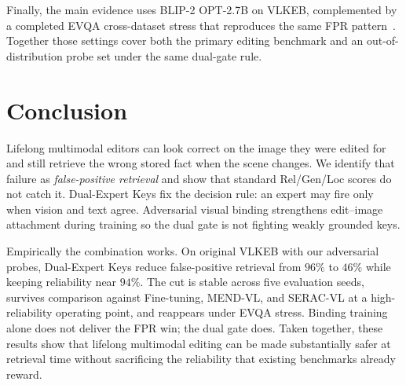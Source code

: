 \documentclass[letterpaper]{article} %
\begin{document}
Finally, the main evidence uses BLIP-2 OPT-2.7B on VLKEB, complemented by a completed EVQA cross-dataset stress that reproduces the same FPR pattern~\cite{li2023blip2,huang2024vlkeb,wang2024easyedit}.
Together those settings cover both the primary editing benchmark and an out-of-distribution probe set under the same dual-gate rule.

\section{Conclusion}
Lifelong multimodal editors can look correct on the image they were edited for and still retrieve the wrong stored fact when the scene changes.
We identify that failure as \emph{false-positive retrieval} and show that standard Rel/Gen/Loc scores do not catch it.
Dual-Expert Keys fix the decision rule: an expert may fire only when vision and text agree.
Adversarial visual binding strengthens edit--image attachment during training so the dual gate is not fighting weakly grounded keys.

Empirically the combination works.
On original VLKEB with our adversarial probes, Dual-Expert Keys reduce false-positive retrieval from $96\%$ to $46\%$ while keeping reliability near $94\%$.
The cut is stable across five evaluation seeds, survives comparison against Fine-tuning, MEND-VL, and SERAC-VL at a high-reliability operating point, and reappears under EVQA stress.
Binding training alone does not deliver the FPR win; the dual gate does.
Taken together, these results show that lifelong multimodal editing can be made substantially safer at retrieval time without sacrificing the reliability that existing benchmarks already reward.



\end{document}

